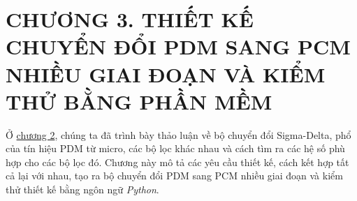 \section*{CHƯƠNG 3. THIẾT KẾ CHUYỂN ĐỔI PDM SANG PCM NHIỀU GIAI ĐOẠN VÀ KIỂM THỬ BẰNG PHẦN MỀM} \label{chuong3}
\setcounter{section}{3}
\setcounter{subsection}{0}
\setcounter{figure}{0}
\setcounter{table}{0}
Ở \hyperref[chuong2]{chương 2}, chúng ta đã trình bày thảo luận về bộ chuyển đổi Sigma-Delta, phổ của tín hiệu PDM từ micro, các bộ lọc khác nhau và cách tìm ra các hệ số phù hợp cho các bộ lọc đó. Chương này mô tả các yêu cầu thiết kế, cách kết hợp tất cả lại với nhau, tạo ra bộ chuyển đổi PDM sang PCM nhiều giai đoạn và kiểm thử thiết kế bằng ngôn ngữ \textit{Python}.
